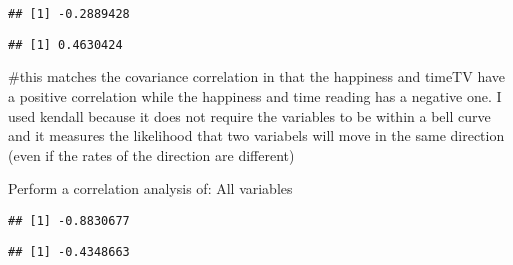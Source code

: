 \documentclass[
]{article}
\newenvironment{Shaded}{\begin{snugshade}}{\end{snugshade}}
\newcommand{\AttributeTok}[1]{\textcolor[rgb]{0.77,0.63,0.00}{#1}}
\newcommand{\FunctionTok}[1]{\textcolor[rgb]{0.00,0.00,0.00}{#1}}
\newcommand{\NormalTok}[1]{#1}
\newcommand{\SpecialCharTok}[1]{\textcolor[rgb]{0.00,0.00,0.00}{#1}}
\newcommand{\StringTok}[1]{\textcolor[rgb]{0.31,0.60,0.02}{#1}}
\begin{document}
\begin{verbatim}
## [1] -0.2889428
\end{verbatim}

\begin{Shaded}
\end{Shaded}

\begin{verbatim}
## [1] 0.4630424
\end{verbatim}

\#this matches the covariance correlation in that the happiness and
timeTV have a positive correlation while the happiness and time reading
has a negative one. I used kendall because it does not require the
variables to be within a bell curve and it measures the likelihood that
two variabels will move in the same direction (even if the rates of the
direction are different)

Perform a correlation analysis of: All variables

\begin{Shaded}
\end{Shaded}

\begin{verbatim}
## [1] -0.8830677
\end{verbatim}

\begin{Shaded}
\end{Shaded}

\begin{verbatim}
## [1] -0.4348663
\end{verbatim}

\begin{Shaded}
\end{Shaded}
\end{document}
